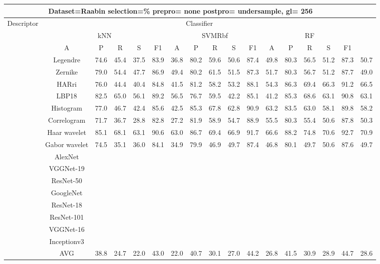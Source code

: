 \documentclass[12pt,italian]{article}
\begin{document}
\begin{tiny}
\begin{longtable}{lcccccccccccccccc}
\toprule
\multicolumn{16}{c}{Dataset=Raabin selection=\% prepro= none postpro= undersample, gl= 256} \\ 
\toprule
Descriptor & \multicolumn{15}{c}{Classifier} \\ 
& \multicolumn{5}{c}{kNN} & \multicolumn{5}{c}{SVMRbf} & \multicolumn{5}{c}{RF} \\ 
& A & P & R & S & F1 & A & P & R & S & F1 & A & P & R & S & F1 \\ 
\midrule
& Legendre & 74.6 & 45.4 & 37.5 & 83.9 & 36.8 & 80.2 & 59.6 & 50.6 & 87.4 & 49.8 & 80.3 & 56.5 & 51.2 & 87.3 & 50.7 \\ 
& Zernike & 79.0 & 54.4 & 47.7 & 86.9 & 49.4 & 80.2 & 61.5 & 51.5 & 87.3 & 51.7 & 80.3 & 56.7 & 51.2 & 87.7 & 49.0 \\ 
& HARri & 76.0 & 44.4 & 40.4 & 84.8 & 41.5 & 81.2 & 58.2 & 53.2 & 88.1 & 54.3 & 86.3 & 69.4 & 66.3 & 91.2 & 66.5 \\ 
& LBP18 & 82.5 & 65.0 & 56.1 & 89.2 & 56.5 & 76.7 & 59.5 & 42.2 & 85.1 & 41.2 & 85.3 & 68.6 & 63.1 & 90.8 & 63.1 \\ 
& Histogram & 77.0 & 46.7 & 42.4 & 85.6 & 42.5 & 85.3 & 67.8 & 62.8 & 90.9 & 63.2 & 83.5 & 63.0 & 58.1 & 89.8 & 58.2 \\ 
& Correlogram & 71.7 & 36.7 & 28.8 & 82.8 & 27.2 & 81.9 & 58.9 & 54.7 & 88.9 & 55.5 & 80.3 & 55.4 & 50.6 & 87.8 & 50.3 \\ 
& Haar wavelet & 85.1 & 68.1 & 63.1 & 90.6 & 63.0 & 86.7 & 69.4 & 66.9 & 91.7 & 66.6 & 88.2 & 74.8 & 70.6 & 92.7 & 70.9 \\ 
& Gabor wavelet & 74.5 & 35.1 & 36.0 & 84.1 & 34.9 & 79.9 & 46.9 & 49.7 & 87.4 & 46.8 & 80.1 & 49.7 & 50.6 & 87.6 & 49.7 \\ 
& AlexNet \\ 
& VGGNet-19 \\ 
& ResNet-50 \\ 
& GoogleNet \\ 
& ResNet-18 \\ 
& ResNet-101 \\ 
& VGGNet-16 \\ 
& Inceptionv3 \\ 
\hline
& AVG & 38.8 & 24.7 & 22.0 & 43.0 & 22.0 & 40.7 & 30.1 & 27.0 & 44.2 & 26.8 & 41.5 & 30.9 & 28.9 & 44.7 & 28.6 \\ 
\hline
\bottomrule
\end{longtable} 


\end{tiny}
\end{document}
